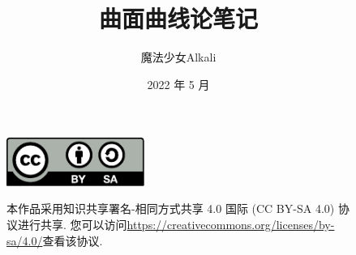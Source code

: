 \documentclass[11pt,fontset=none]{ctexbook}
\title{曲面曲线论笔记}
\author{魔法少女Alkali}
\affil{北京师范大学数学科学学院}
\date{2022 年 5 月}
\numberwithin{equation}{section}
\theoremstyle{definition}
\theoremstyle{plain}
\theoremstyle{remark}
\begin{document}
    \maketitle
    \vspace*{13cm}
    \thispagestyle{empty}
    \begin{figure}[ht]
        \includegraphics[width=0.4\textwidth]{by-sa.pdf}\hspace{0.05\textwidth}\begin{minipage}[b]{0.55\textwidth}
        \small
        本作品采用知识共享署名-相同方式共享 4.0 国际 (CC BY-SA 4.0) 协议进行共享.
        您可以访问\url{https://creativecommons.org/licenses/by-sa/4.0/}查看该协议.
        \end{minipage}
    \end{figure}

    \frontmatter
    

    \tableofcontents

    \mainmatter
    
    
    
    

    \appendix
    \printbibliography[title={参考文献},heading=bibintoc]
\end{document}
